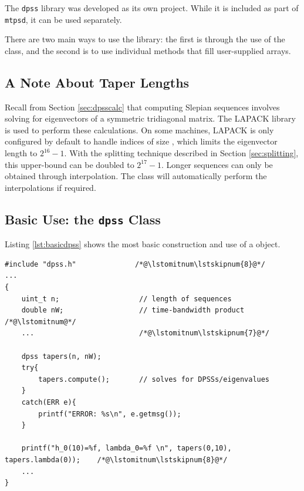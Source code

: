 The \texttt{dpss} library was developed as its own project.  While it is included as part of \texttt{mtpsd}, it can be used separately.

There are two main ways to use the library: the first is through the use of the  class, and the second is to use individual methods that fill user-supplied arrays.

\addtocounter{subsection}{-1}
\subsection{A Note About Taper Lengths}

Recall from Section \ref{sec:dpsscalc} that computing Slepian sequences involves solving for eigenvectors of a symmetric tridiagonal matrix.  The LAPACK library is used to perform these calculations.  On some machines, LAPACK is only configured by default to handle indices of size , which limits the eigenvector length to $2^{16}-1$.  With the splitting technique described in Section \ref{sec:splitting}, this upper-bound can be doubled to $2^{17}-1$.  Longer sequences can only be obtained through interpolation. The  class will automatically perform the interpolations if required.

\subsection{Basic Use: the \texttt{dpss} Class}

Listing \ref{lst:basicdpss} shows the most basic construction and use of a  object.  
\begin{lstlisting}[label=lst:basicdpss,caption=Basic example of the \texttt{dpss} class]
#include "dpss.h"              /*@\lstomitnum\lstskipnum{8}@*/
...
{
    uint_t n;                   // length of sequences
    double nW;                  // time-bandwidth product   /*@\lstomitnum@*/
    ...                         /*@\lstomitnum\lstskipnum{7}@*/
    
    dpss tapers(n, nW);
    try{
        tapers.compute();       // solves for DPSSs/eigenvalues
    }
    catch(ERR e){
        printf("ERROR: %s\n", e.getmsg());   
    }
    
    printf("h_0(10)=%f, lambda_0=%f \n", tapers(0,10), tapers.lambda(0));    /*@\lstomitnum\lstskipnum{8}@*/
    ...
}
\end{lstlisting} 
\smallskip

